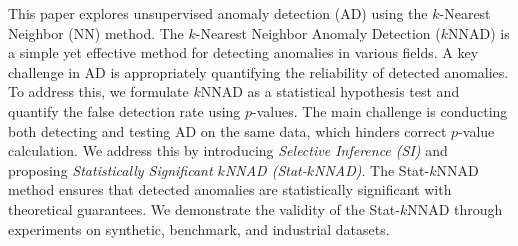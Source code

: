 This paper explores unsupervised anomaly detection (AD) using the $k$-Nearest Neighbor (NN) method.
%
The $k$-Nearest Neighbor Anomaly Detection ($k$NNAD) is a simple yet effective method for detecting anomalies in various fields.
%
A key challenge in AD is appropriately quantifying the reliability of detected anomalies.
%
To address this, we formulate $k$NNAD as a statistical hypothesis test and quantify the false detection rate using $p$-values.
%
The main challenge is conducting both detecting and testing AD on the same data, which hinders correct $p$-value calculation. 
%
We address this by introducing \emph{Selective Inference (SI)} and proposing \emph{Statistically Significant $k$NNAD (Stat-$k$NNAD)}.
%
The Stat-$k$NNAD method ensures that detected anomalies are statistically significant with theoretical guarantees.
%
We demonstrate the validity of the Stat-$k$NNAD through experiments on synthetic, benchmark, and industrial datasets.


